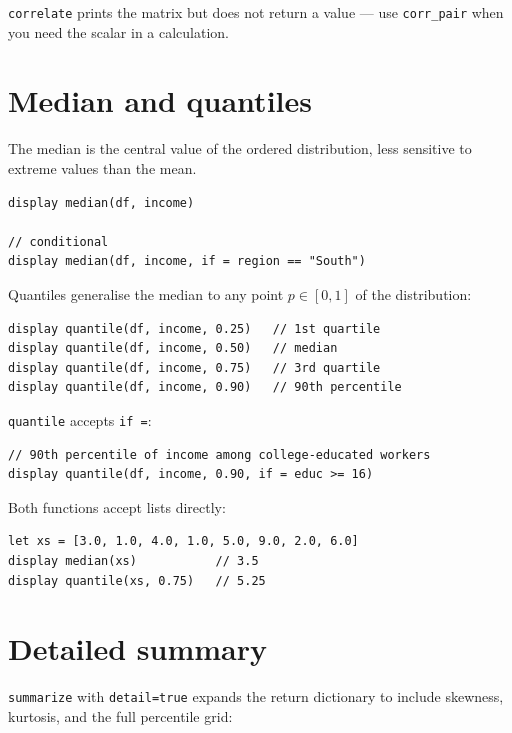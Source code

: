 \begin{nota}
  \lstinline{correlate} prints the matrix but does not return a value —
  use \lstinline{corr_pair} when you need the scalar in a calculation.
\end{nota}

\section{Median and quantiles}

The median is the central value of the ordered distribution, less
sensitive to extreme values than the mean.

\begin{lstlisting}[caption={Median}]
display median(df, income)

// conditional
display median(df, income, if = region == "South")
\end{lstlisting}

Quantiles generalise the median to any point $p \in [0, 1]$ of the
distribution:

\begin{lstlisting}[caption={Quantiles}]
display quantile(df, income, 0.25)   // 1st quartile
display quantile(df, income, 0.50)   // median
display quantile(df, income, 0.75)   // 3rd quartile
display quantile(df, income, 0.90)   // 90th percentile
\end{lstlisting}

\lstinline{quantile} accepts \lstinline{if =}:

\begin{lstlisting}
// 90th percentile of income among college-educated workers
display quantile(df, income, 0.90, if = educ >= 16)
\end{lstlisting}

Both functions accept lists directly:

\begin{lstlisting}
let xs = [3.0, 1.0, 4.0, 1.0, 5.0, 9.0, 2.0, 6.0]
display median(xs)           // 3.5
display quantile(xs, 0.75)   // 5.25
\end{lstlisting}

\section{Detailed summary}

\lstinline{summarize} with \lstinline{detail=true} expands the return
dictionary to include skewness, kurtosis, and the full percentile grid:

